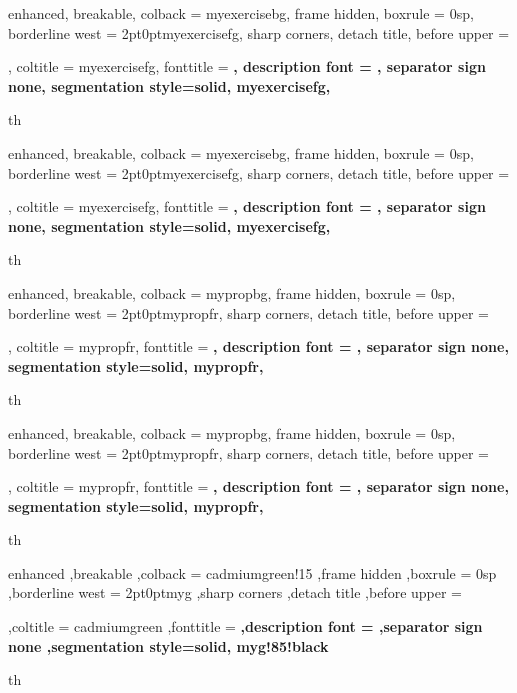 {%
	enhanced,
	breakable,
	colback = myexercisebg,
	frame hidden,
	boxrule = 0sp,
	borderline west = {2pt}{0pt}{myexercisefg},
	sharp corners,
	detach title,
	before upper = \tcbtitle\par\smallskip,
	coltitle = myexercisefg,
	fonttitle = \bfseries\sffamily,
	description font = \mdseries,
	separator sign none,
	segmentation style={solid, myexercisefg},
}
{th}

{%
	enhanced,
	breakable,
	colback = myexercisebg,
	frame hidden,
	boxrule = 0sp,
	borderline west = {2pt}{0pt}{myexercisefg},
	sharp corners,
	detach title,
	before upper = \tcbtitle\par\smallskip,
	coltitle = myexercisefg,
	fonttitle = \bfseries\sffamily,
	description font = \mdseries,
	separator sign none,
	segmentation style={solid, myexercisefg},
}
{th}



{%
	enhanced,
	breakable,
	colback = mypropbg,
	frame hidden,
	boxrule = 0sp,
	borderline west = {2pt}{0pt}{mypropfr},
	sharp corners,
	detach title,
	before upper = \tcbtitle\par\smallskip,
	coltitle = mypropfr,
	fonttitle = \bfseries\sffamily,
	description font = \mdseries,
	separator sign none,
	segmentation style={solid, mypropfr},
}
{th}

{%
	enhanced,
	breakable,
	colback = mypropbg,
	frame hidden,
	boxrule = 0sp,
	borderline west = {2pt}{0pt}{mypropfr},
	sharp corners,
	detach title,
	before upper = \tcbtitle\par\smallskip,
	coltitle = mypropfr,
	fonttitle = \bfseries\sffamily,
	description font = \mdseries,
	separator sign none,
	segmentation style={solid, mypropfr},
}
{th}



{%
	enhanced
	,breakable
	,colback = cadmiumgreen!15
	,frame hidden
	,boxrule = 0sp
	,borderline west = {2pt}{0pt}{myg}
	,sharp corners
	,detach title
	,before upper = \tcbtitle\par\smallskip
	,coltitle = cadmiumgreen
	,fonttitle = \bfseries\sffamily
	,description font = \mdseries
	,separator sign none
	,segmentation style={solid, myg!85!black}
}
{th}



